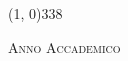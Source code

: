 \begin{titlepage}
\begin{center}
\vspace{20pt}

\line(1, 0){338} \\
\begin{normalsize}
\textsc{Anno Accademico \myAA}
\end{normalsize}

\end{center}
\end{titlepage} 